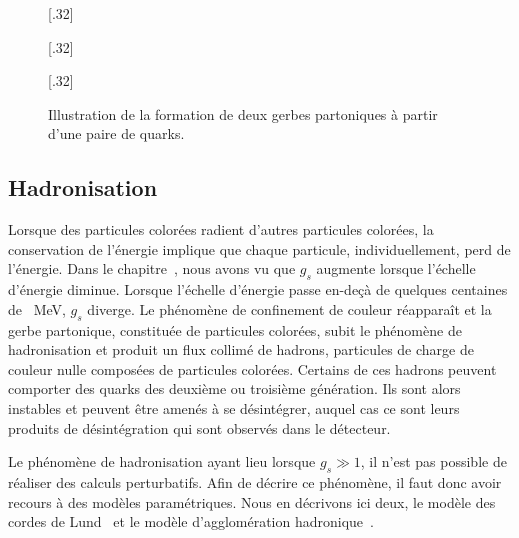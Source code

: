 \begin{figure}[h]
\centering
{}[.32\textwidth]
{\begin{tikzpicture}

\end{tikzpicture}}
\hfill
{}[.32\textwidth]
{\begin{tikzpicture}


\end{tikzpicture}}
\hfill
{}[.32\textwidth]
{\begin{tikzpicture}



\end{tikzpicture}}

\caption[Formation de deux gerbes partoniques.]{Illustration de la formation de deux gerbes partoniques à partir d'une paire de quarks.}
\label{fig-parton_shower}
\end{figure}

\subsection{Hadronisation}\label{chapter-JERC-section-jets-subsec-hadronisation}
Lorsque des particules colorées radient d'autres particules colorées, la conservation de l'énergie implique que chaque particule, individuellement, perd de l'énergie.
Dans le chapitre~, nous avons vu que $g_s$ augmente lorsque l'échelle d'énergie diminue. 
Lorsque l'échelle d'énergie passe en-deçà de quelques centaines de \SI{}{\MeV}, $g_s$ diverge.
Le phénomène de confinement de couleur réapparaît et la gerbe partonique, constituée de particules colorées, subit le phénomène de hadronisation et produit un flux collimé de hadrons, particules de charge de couleur nulle composées de particules colorées.
Certains de ces hadrons peuvent comporter des quarks des deuxième ou troisième génération. Ils sont alors instables et peuvent être amenés à se désintégrer, auquel cas ce sont leurs produits de désintégration qui sont observés dans le détecteur.
\par Le phénomène de hadronisation ayant lieu lorsque $g_s\gg1$, il n'est pas possible de réaliser des calculs perturbatifs. Afin de décrire ce phénomène, il faut donc avoir recours à des modèles paramétriques. Nous en décrivons ici deux, le modèle des cordes de Lund~\cite{Andersson_parton_fragmentation} et le modèle d'agglomération hadronique~\cite{Winter_2004}.
